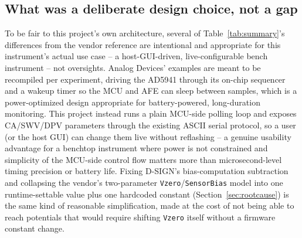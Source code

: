 \subsection{What was a deliberate design choice, not a gap}
\label{sec:deliberate}
To be fair to this project's own architecture, several of
Table~\ref{tab:summary}'s differences from the vendor reference are
intentional and appropriate for this instrument's actual use case -- a
host-GUI-driven, live-configurable bench instrument -- not oversights.
Analog Devices' examples are meant to be recompiled per experiment,
driving the AD5941 through its on-chip sequencer and a wakeup timer so the
MCU and AFE can sleep between samples, which is a power-optimized design
appropriate for battery-powered, long-duration monitoring. This project
instead runs a plain MCU-side polling loop and exposes CA/SWV/DPV
parameters through the existing ASCII serial protocol, so a user (or the
host GUI) can change them live without reflashing -- a genuine usability
advantage for a benchtop instrument where power is not constrained and
simplicity of the MCU-side control flow matters more than microsecond-level
timing precision or battery life. Fixing D-SIGN's bias-computation
subtraction and collapsing the vendor's two-parameter
\texttt{Vzero}/\texttt{SensorBias} model into one runtime-settable value
plus one hardcoded constant (Section~\ref{sec:rootcause}) is the same kind
of reasonable simplification, made at the cost of not being able to reach
potentials that would require shifting \texttt{Vzero} itself without a
firmware constant change.


